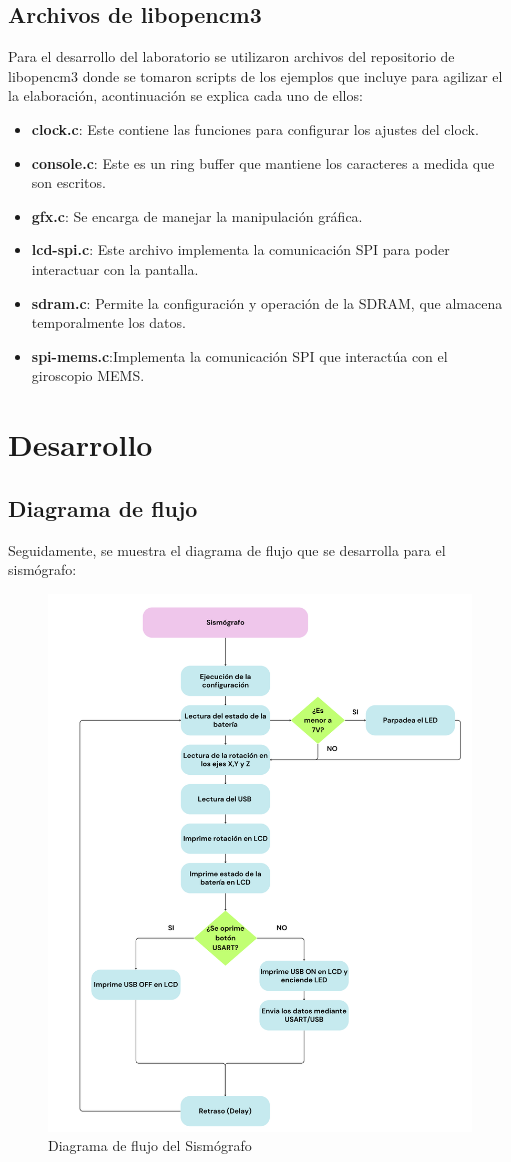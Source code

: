 \documentclass[12pt,a4paper]{article}
\begin{document}
\subsection{Archivos de libopencm3}
Para el desarrollo del laboratorio se utilizaron archivos del repositorio de libopencm3 \cite{libopencm3} donde se tomaron scripts de los ejemplos que incluye para agilizar el la elaboración, acontinuación se explica cada uno de ellos:
\begin{itemize}
    \item \textbf{clock.c}: Este contiene las funciones para configurar los ajustes del clock.
    \item \textbf{console.c}: Este es un ring buffer que mantiene los caracteres a medida que son escritos.
    \item \textbf{gfx.c}: Se encarga de manejar la manipulación gráfica.
    \item \textbf{lcd-spi.c}: Este archivo implementa la comunicación SPI para poder interactuar con la pantalla.
    \item \textbf{sdram.c}: Permite la configuración y operación de la SDRAM, que almacena temporalmente los datos.
    \item \textbf{spi-mems.c}:Implementa la comunicación SPI que interactúa con el giroscopio MEMS.
\end{itemize}

\section{Desarrollo}

\subsection{Diagrama de flujo}
Seguidamente, se muestra el diagrama de flujo que se desarrolla para el sismógrafo:

\begin{figure}[H]
    \centering
    \includegraphics[width=0.5\linewidth]{Imagenes/df.png}
    \caption{Diagrama de flujo del Sismógrafo}
    \label{fig:5}
\end{figure}
\end{document}
